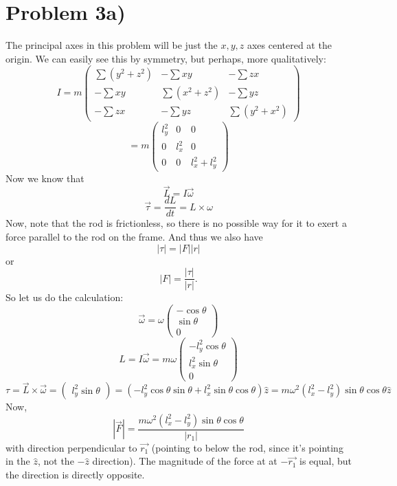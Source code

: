 \section*{Problem 3a)}
The principal axes in this problem will be just the $x,y,z$ axes centered at the origin. We can easily see this by symmetry, but perhaps, more qualitatively: 
\[ I = m\begin{pmatrix} 
\sum (y^2 + z^2) & - \sum xy & - \sum zx \\
- \sum xy & \sum (x^2+z^2) & -\sum yz \\
- \sum zx & -\sum yz & \sum (y^2 + x^2) 
\end{pmatrix} \]
\[ = m\begin{pmatrix}
l_y^2&0&0\\
0&l_x^2&0\\
0&0&l_x^2+l_y^2
\end{pmatrix} \]
Now we know that
\[ \vec{L} = I \vec{\omega} \]
\[ \vec{\tau} = \frac{dL}{dt} = L \times \omega \]
Now, note that the rod is frictionless, so there is no possible way for it to exert a force parallel to the rod on the frame. And thus we also have
\[ | \tau | = |F||r| \]
or 
\[ |F| = \frac{|\tau|}{|r|}. \]
So let us do the calculation:
\[ \vec{\omega} = \omega \begin{pmatrix}
-\cos \theta \\ \sin \theta \\ 0
\end{pmatrix} \]
\[ L = I \vec{\omega} = m\omega \begin{pmatrix}
- l_y^2 \cos \theta \\ l_x^2\sin \theta \\ 0
\end{pmatrix} \]
\[\tau = \vec{L} \times \vec{\omega} =\begin{pmatrix} 
l_y^2 \sin \theta \end{pmatrix} = (-l_y^2 \cos \theta\sin \theta + l_x^2 \sin\theta\cos\theta)\hat{z}  = m\omega^2 (l_x^2-l_y^2) \sin\theta\cos\theta \hat{z} \]
Now,
\[ |\vec{F}|=\dfrac{m\omega^2 (l_x^2-l_y^2) \sin \theta \cos\theta}{|r_1|} \]
with direction perpendicular to $\vec{r_1}$ (pointing to below the rod, since it's pointing in the $\hat{z}$, not the $-\hat{z}$ direction). The magnitude of the force at at $-\vec{r_1}$ is equal, but the direction is directly opposite.
